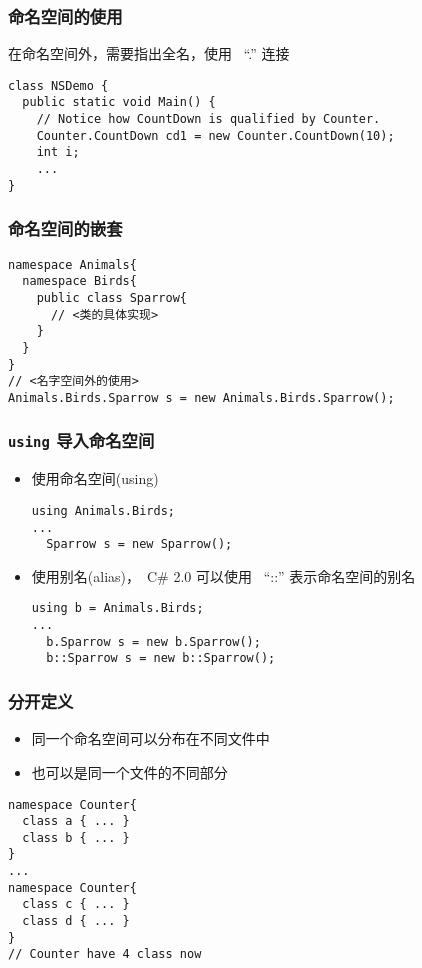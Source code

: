 \begin{frame}[fragile]
\frametitle{命名空间的使用}
在命名空间外，需要指出全名，使用 ~``.'' 连接
\begin{lstlisting}
class NSDemo {
  public static void Main() {
    // Notice how CountDown is qualified by Counter.
    Counter.CountDown cd1 = new Counter.CountDown(10);
    int i;
    ...
}
\end{lstlisting}
\end{frame}

\begin{frame}[fragile]
\frametitle{命名空间的嵌套}
\begin{lstlisting}[escapeinside=<>]
namespace Animals{
  namespace Birds{
    public class Sparrow{
      // <类的具体实现>
    }
  }
}
// <名字空间外的使用>
Animals.Birds.Sparrow s = new Animals.Birds.Sparrow();
\end{lstlisting}
\end{frame}

\begin{frame}[fragile]
\frametitle{\texttt{using} 导入命名空间}

\begin{itemize}
\item 使用命名空间(using)
\begin{lstlisting}
using Animals.Birds;
...
  Sparrow s = new Sparrow();
\end{lstlisting}
\item 使用别名(alias)，~C\# 2.0 可以使用 ~``::'' 表示命名空间的别名
\begin{lstlisting}
using b = Animals.Birds;
...
  b.Sparrow s = new b.Sparrow();
  b::Sparrow s = new b::Sparrow();
\end{lstlisting}
\end{itemize}
\end{frame}

\begin{frame}[fragile]
\frametitle{分开定义}
\begin{itemize}
\item 同一个命名空间可以分布在不同文件中
\item 也可以是同一个文件的不同部分
\end{itemize}
\begin{lstlisting}
namespace Counter{
  class a { ... }
  class b { ... }
}
...
namespace Counter{
  class c { ... }
  class d { ... }
}
// Counter have 4 class now
\end{lstlisting}
\end{frame}

